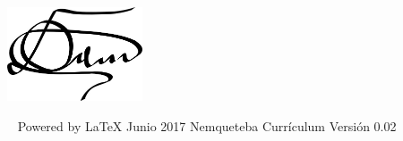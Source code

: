 \documentclass[overlapped,line,final]{res}
\begin{document}
\begin{resume}
\vspace{\fill}
\begin{minipage}{1.0\linewidth}
\begin{center}
	\includegraphics[width=4cm,bb=0 0 598 417]{./firma.jpeg}
\end{center}

\end{minipage}

\vspace{\fill}\ \newline
{\tiny \rm $ $Powered by \LaTeX $ $ }
{\tiny \rm $ $Junio 2017$ $ }
{\tiny \rm $ $Nemqueteba Currículum Versión 0.02 $ $ }

\end{resume}
\end{document}
